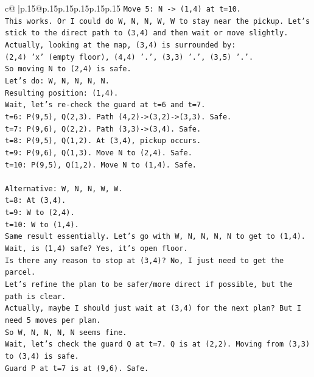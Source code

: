 \documentclass{article}
\begin{document}
{\begin{supertabular}{c@{$\;$}|p{.15\linewidth}@{}p{.15\linewidth}p{.15\linewidth}p{.15\linewidth}p{.15\linewidth}p{.15\linewidth}}
{{{\texttt{Move 5: N {-}> (1,4) at t=10.} \\
\texttt{This works. Or I could do W, N, N, W, W to stay near the pickup. Let's stick to the direct path to (3,4) and then wait or move slightly.} \\
\texttt{Actually, looking at the map, (3,4) is surrounded by:} \\
\texttt{(2,4) 'x' (empty floor), (4,4) '.', (3,3) '.', (3,5) '.'.} \\
\texttt{So moving N to (2,4) is safe.} \\
\texttt{Let's do: W, N, N, N, N.} \\
\texttt{Resulting position: (1,4).} \\
\texttt{Wait, let's re{-}check the guard at t=6 and t=7.} \\
\texttt{t=6: P(9,5), Q(2,3). Path (4,2){-}>(3,2){-}>(3,3). Safe.} \\
\texttt{t=7: P(9,6), Q(2,2). Path (3,3){-}>(3,4). Safe.} \\
\texttt{t=8: P(9,5), Q(1,2). At (3,4), pickup occurs.} \\
\texttt{t=9: P(9,6), Q(1,3). Move N to (2,4). Safe.} \\
\texttt{t=10: P(9,5), Q(1,2). Move N to (1,4). Safe.} \\
\\ 
\texttt{Alternative: W, N, N, W, W.} \\
\texttt{t=8: At (3,4).} \\
\texttt{t=9: W to (2,4).} \\
\texttt{t=10: W to (1,4).} \\
\texttt{Same result essentially. Let's go with W, N, N, N, N to get to (1,4).} \\
\texttt{Wait, is (1,4) safe? Yes, it's open floor.} \\
\texttt{Is there any reason to stop at (3,4)? No, I just need to get the parcel.} \\
\texttt{Let's refine the plan to be safer/more direct if possible, but the path is clear.} \\
\texttt{Actually, maybe I should just wait at (3,4) for the next plan? But I need 5 moves per plan.} \\
\texttt{So W, N, N, N, N seems fine.} \\
\texttt{Wait, let's check the guard Q at t=7. Q is at (2,2). Moving from (3,3) to (3,4) is safe.} \\
\texttt{Guard P at t=7 is at (9,6). Safe.} \\
\\ 
}}}
\end{supertabular}}
\end{document}
